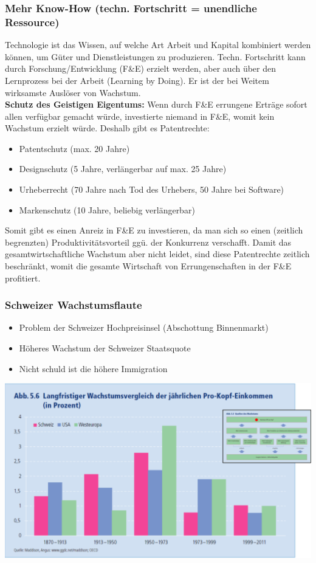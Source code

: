 \subsubsection{Mehr Know-How (techn. Fortschritt = unendliche Ressource)}
Technologie ist das Wissen, auf welche Art Arbeit und Kapital kombiniert werden können, um Güter und Dienstleistungen zu produzieren. Techn. Fortschritt kann durch Forschung/Entwicklung (F\&E) erzielt werden, aber auch über den Lernprozess bei der Arbeit (Learning by Doing). Er ist der bei Weitem wirksamste Auslöser von Wachstum.\\
\textbf{Schutz des Geistigen Eigentums:} Wenn durch F\&E errungene Erträge sofort allen verfügbar gemacht würde, investierte niemand in F\&E, womit kein Wachstum erzielt würde. Deshalb gibt es Patentrechte:
\begin{itemize}
	\item Patentschutz (max. 20 Jahre)
	\item Designschutz (5 Jahre, verlängerbar auf max. 25 Jahre)
	\item Urheberrecht (70 Jahre nach Tod des Urhebers, 50 Jahre bei Software)
	\item Markenschutz (10 Jahre, beliebig verlängerbar)
\end{itemize}
Somit gibt es einen Anreiz in F\&E zu investieren, da man sich so einen (zeitlich begrenzten) Produktivitätsvorteil ggü. der Konkurrenz verschafft. Damit das gesamtwirtschaftliche Wachstum aber nicht leidet, sind diese Patentrechte zeitlich beschränkt, womit die gesamte Wirtschaft von Errungenschaften in der F\&E profitiert.

\begin{multicols}{2}
\subsubsection{Schweizer Wachstumsflaute}
\begin{itemize}
	\item Problem der Schweizer Hochpreisinsel (Abschottung Binnenmarkt)
	\item Höheres Wachstum der Schweizer Staatsquote
	\item Nicht schuld ist die höhere Immigration
\end{itemize}
\vfill\null
\columnbreak
\includegraphics[width=\linewidth]{images/wachstumsvergleich.png}
\vfill\null
\end{multicols}

